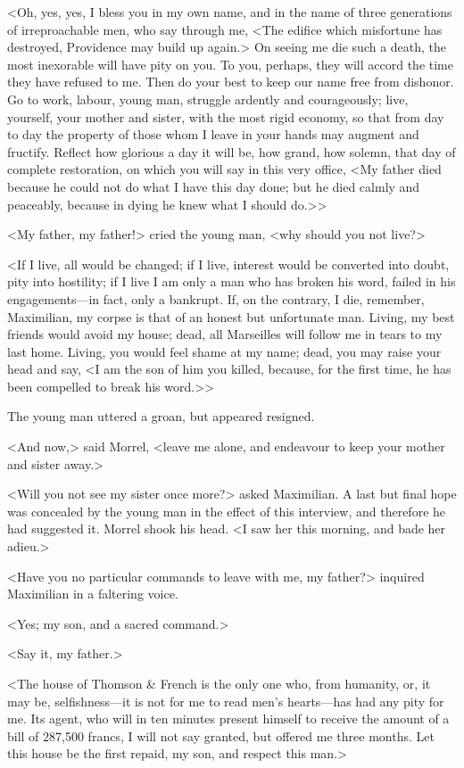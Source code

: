  <Oh, yes, yes, I bless you in my own name, and in the name of three generations of irreproachable men, who say through me, <The edifice which misfortune has destroyed, Providence may build up again.> On seeing me die such a death, the most inexorable will have pity on you. To you, perhaps, they will accord the time they have refused to me. Then do your best to keep our name free from dishonor. Go to work, labour, young man, struggle ardently and courageously; live, yourself, your mother and sister, with the most rigid economy, so that from day to day the property of those whom I leave in your hands may augment and fructify. Reflect how glorious a day it will be, how grand, how solemn, that day of complete restoration, on which you will say in this very office, <My father died because he could not do what I have this day done; but he died calmly and peaceably, because in dying he knew what I should do.>> 

 <My father, my father!> cried the young man, <why should you not live?> 

 <If I live, all would be changed; if I live, interest would be converted into doubt, pity into hostility; if I live I am only a man who has broken his word, failed in his engagements—in fact, only a bankrupt. If, on the contrary, I die, remember, Maximilian, my corpse is that of an honest but unfortunate man. Living, my best friends would avoid my house; dead, all Marseilles will follow me in tears to my last home. Living, you would feel shame at my name; dead, you may raise your head and say, <I am the son of him you killed, because, for the first time, he has been compelled to break his word.>> 

 The young man uttered a groan, but appeared resigned. 

 <And now,> said Morrel, <leave me alone, and endeavour to keep your mother and sister away.> 

 <Will you not see my sister once more?> asked Maximilian. A last but final hope was concealed by the young man in the effect of this interview, and therefore he had suggested it. Morrel shook his head. <I saw her this morning, and bade her adieu.> 

 <Have you no particular commands to leave with me, my father?> inquired Maximilian in a faltering voice. 

 <Yes; my son, and a sacred command.> 

 <Say it, my father.> 

 <The house of Thomson \& French is the only one who, from humanity, or, it may be, selfishness—it is not for me to read men's hearts—has had any pity for me. Its agent, who will in ten minutes present himself to receive the amount of a bill of 287,500 francs, I will not say granted, but offered me three months. Let this house be the first repaid, my son, and respect this man.> 

